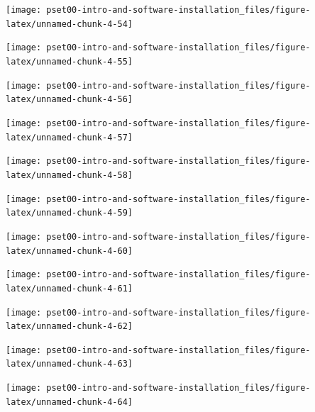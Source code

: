 \documentclass[
]{article}
\begin{document}
\begin{center}\texttt{[image: pset00-intro-and-software-installation\_files/figure-latex/unnamed-chunk-4-54]} \end{center}

\begin{center}\texttt{[image: pset00-intro-and-software-installation\_files/figure-latex/unnamed-chunk-4-55]} \end{center}

\begin{center}\texttt{[image: pset00-intro-and-software-installation\_files/figure-latex/unnamed-chunk-4-56]} \end{center}

\begin{center}\texttt{[image: pset00-intro-and-software-installation\_files/figure-latex/unnamed-chunk-4-57]} \end{center}

\begin{center}\texttt{[image: pset00-intro-and-software-installation\_files/figure-latex/unnamed-chunk-4-58]} \end{center}

\begin{center}\texttt{[image: pset00-intro-and-software-installation\_files/figure-latex/unnamed-chunk-4-59]} \end{center}

\begin{center}\texttt{[image: pset00-intro-and-software-installation\_files/figure-latex/unnamed-chunk-4-60]} \end{center}

\begin{center}\texttt{[image: pset00-intro-and-software-installation\_files/figure-latex/unnamed-chunk-4-61]} \end{center}

\begin{center}\texttt{[image: pset00-intro-and-software-installation\_files/figure-latex/unnamed-chunk-4-62]} \end{center}

\begin{center}\texttt{[image: pset00-intro-and-software-installation\_files/figure-latex/unnamed-chunk-4-63]} \end{center}

\begin{center}\texttt{[image: pset00-intro-and-software-installation\_files/figure-latex/unnamed-chunk-4-64]} \end{center}
\end{document}
